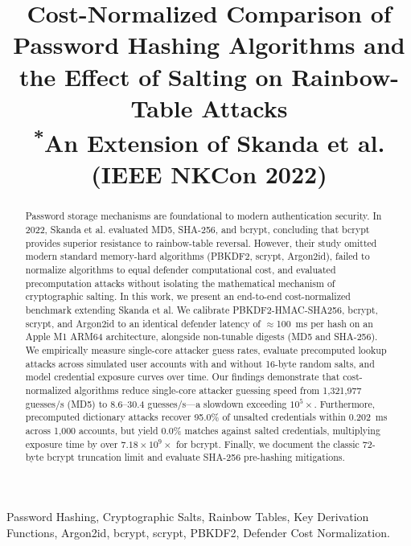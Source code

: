 \documentclass[conference]{IEEEtran}
\begin{document}
\title{Cost-Normalized Comparison of Password Hashing Algorithms and the Effect of Salting on Rainbow-Table Attacks\\
{\footnotesize \textsuperscript{*}An Extension of Skanda et al. (IEEE NKCon 2022)}
}

\author{
}

\maketitle

\begin{abstract}
Password storage mechanisms are foundational to modern authentication security. In 2022, Skanda et al. evaluated MD5, SHA-256, and bcrypt, concluding that bcrypt provides superior resistance to rainbow-table reversal. However, their study omitted modern standard memory-hard algorithms (PBKDF2, scrypt, Argon2id), failed to normalize algorithms to equal defender computational cost, and evaluated precomputation attacks without isolating the mathematical mechanism of cryptographic salting. In this work, we present an end-to-end cost-normalized benchmark extending Skanda et al. We calibrate PBKDF2-HMAC-SHA256, bcrypt, scrypt, and Argon2id to an identical defender latency of $\approx$100~ms per hash on an Apple M1 ARM64 architecture, alongside non-tunable digests (MD5 and SHA-256). We empirically measure single-core attacker guess rates, evaluate precomputed lookup attacks across simulated user accounts with and without 16-byte random salts, and model credential exposure curves over time. Our findings demonstrate that cost-normalized algorithms reduce single-core attacker guessing speed from 1,321,977 guesses/s (MD5) to 8.6--30.4 guesses/s---a slowdown exceeding $10^5\times$. Furthermore, precomputed dictionary attacks recover 95.0\% of unsalted credentials within 0.202~ms across 1,000 accounts, but yield 0.0\% matches against salted credentials, multiplying exposure time by over $7.18 \times 10^9\times$ for bcrypt. Finally, we document the classic 72-byte bcrypt truncation limit and evaluate SHA-256 pre-hashing mitigations.
\end{abstract}

\begin{IEEEkeywords}
Password Hashing, Cryptographic Salts, Rainbow Tables, Key Derivation Functions, Argon2id, bcrypt, scrypt, PBKDF2, Defender Cost Normalization.
\end{IEEEkeywords}
\end{document}
